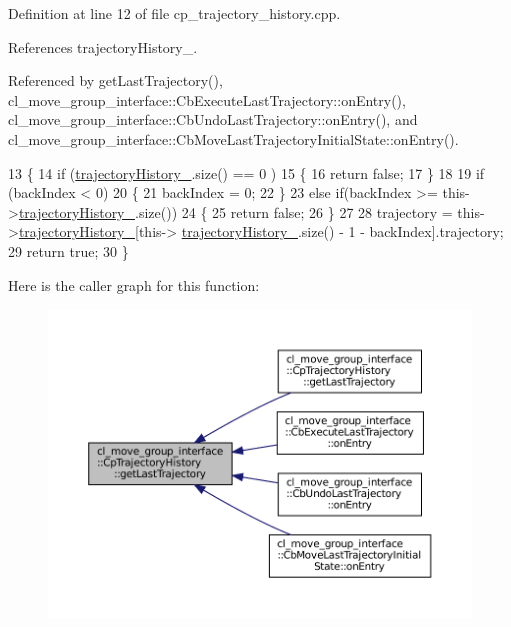 Definition at line 12 of file cp\+\_\+trajectory\+\_\+history.\+cpp.



References trajectory\+History\+\_\+.



Referenced by get\+Last\+Trajectory(), cl\+\_\+move\+\_\+group\+\_\+interface\+::\+Cb\+Execute\+Last\+Trajectory\+::on\+Entry(), cl\+\_\+move\+\_\+group\+\_\+interface\+::\+Cb\+Undo\+Last\+Trajectory\+::on\+Entry(), and cl\+\_\+move\+\_\+group\+\_\+interface\+::\+Cb\+Move\+Last\+Trajectory\+Initial\+State\+::on\+Entry().


\begin{DoxyCode}
13     \{
14         \textcolor{keywordflow}{if} (\hyperlink{classcl__move__group__interface_1_1CpTrajectoryHistory_ac5f17b74ca856f6f8ccb96d9a4786fb2}{trajectoryHistory\_}.size() == 0 )
15         \{
16             \textcolor{keywordflow}{return} \textcolor{keyword}{false};
17         \}
18 
19         \textcolor{keywordflow}{if} (backIndex < 0)
20         \{
21             backIndex = 0;
22         \}
23         \textcolor{keywordflow}{else} \textcolor{keywordflow}{if}(backIndex >= this->\hyperlink{classcl__move__group__interface_1_1CpTrajectoryHistory_ac5f17b74ca856f6f8ccb96d9a4786fb2}{trajectoryHistory\_}.size())
24         \{
25             \textcolor{keywordflow}{return} \textcolor{keyword}{false}; 
26         \}
27 
28         trajectory = this->\hyperlink{classcl__move__group__interface_1_1CpTrajectoryHistory_ac5f17b74ca856f6f8ccb96d9a4786fb2}{trajectoryHistory\_}[this->
      \hyperlink{classcl__move__group__interface_1_1CpTrajectoryHistory_ac5f17b74ca856f6f8ccb96d9a4786fb2}{trajectoryHistory\_}.size() - 1 - backIndex].trajectory;
29         \textcolor{keywordflow}{return} \textcolor{keyword}{true};
30     \}
\end{DoxyCode}
Here is the caller graph for this function\+:
\nopagebreak
\begin{figure}[H]
\begin{center}
\leavevmode
\includegraphics[width=350pt]{classcl__move__group__interface_1_1CpTrajectoryHistory_acca64f5923a0960c704e3e8a727ba3ae_icgraph}
\end{center}
\end{figure}
